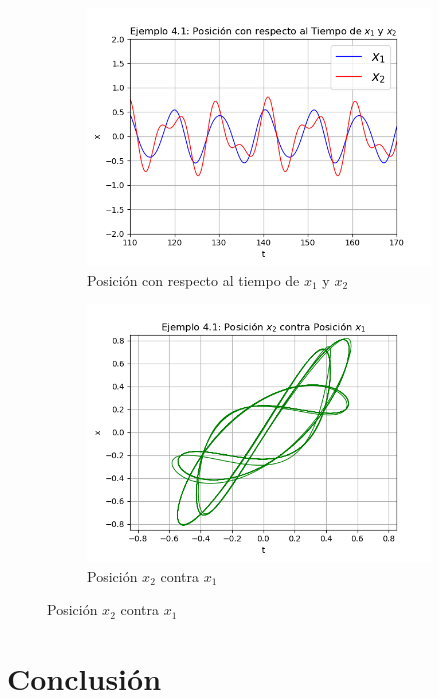 \documentclass[a4paper]{article}
\begin{document}
\begin{center}
\begin{figure}[ht!]
\begin{subfigure}{0.6\textwidth}
  \centering
  \includegraphics[width=\linewidth]{ejemplo_4_1_1.png}
   \caption{Posición con respecto al tiempo de $x_1$ y $x_2$}
\end{subfigure}
\begin{subfigure}{0.6\textwidth}
  \centering
  \includegraphics[width=\linewidth]{ejemplo_4_1_6.png}
  \caption{Posición $x_2$ contra $x_1$}
\end{subfigure}
\end{figure}


\section{Conclusión}


\end{center}
\end{document}
